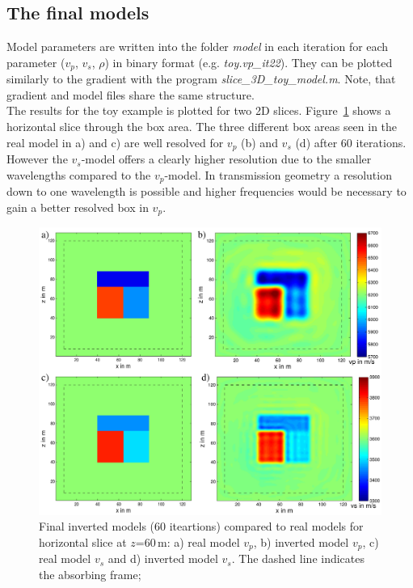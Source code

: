 \subsection{The final models}
Model parameters are written into the folder \textit{model} in each iteration for each parameter ($v_p$, $v_s$, $\rho$) in binary format (e.g. \textit{toy.vp\_it22}). They can be plotted similarly to the gradient with the program \textit{slice\_3D\_toy\_model.m}. Note, that gradient and model files share the same structure.\\
The results for the toy example is plotted for two 2D slices. Figure~\ref{fig:toy_result1} shows a horizontal slice through the box area. The three different box areas seen in the real model in a) and c) are well resolved for $v_p$ (b) and $v_s$ (d) after 60 iterations. However the $v_s$-model offers a clearly higher resolution due to the smaller wavelengths compared to the $v_p$-model. In transmission geometry a resolution down to one wavelength is possible and higher frequencies would be necessary to gain a better resolved box in $v_p$.
\begin{figure}[h!]
\begin{center}
\includegraphics[width=\textwidth]{fig_toy/toy_model_result_new}
\caption[Toy example - final inverted models, horizontal slice]{Final inverted models (60 iteartions) compared to real models for horizontal slice at $z$=60\,m: a) real model $v_p$, b) inverted  model $v_p$, c) real model $v_s$ and d) inverted model $v_s$. The dashed line indicates the absorbing frame;  }\label{fig:toy_result1}
\end{center}
\end{figure}

